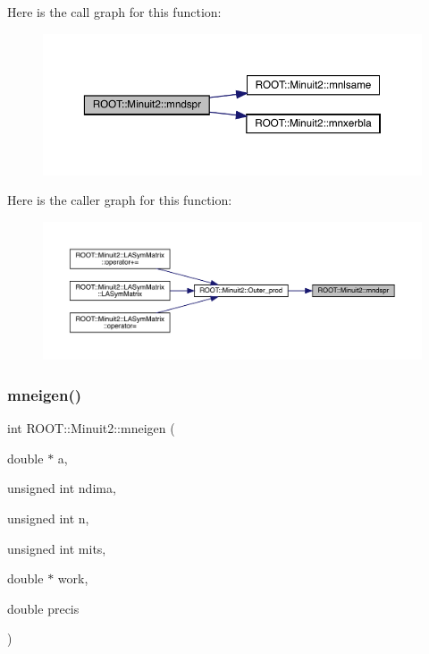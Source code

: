 Here is the call graph for this function\+:
\nopagebreak
\begin{figure}[H]
\begin{center}
\leavevmode
\includegraphics[width=350pt]{d6/d3a/namespaceROOT_1_1Minuit2_acc89c3c759da8dc191d0a862e354a555_cgraph}
\end{center}
\end{figure}
Here is the caller graph for this function\+:
\nopagebreak
\begin{figure}[H]
\begin{center}
\leavevmode
\includegraphics[width=350pt]{d6/d3a/namespaceROOT_1_1Minuit2_acc89c3c759da8dc191d0a862e354a555_icgraph}
\end{center}
\end{figure}
\mbox{\label{namespaceROOT_1_1Minuit2_a4a6b91c57b107c48f582569401bb12e9}} 
\subsubsection{\texorpdfstring{mneigen()}{mneigen()}}
{\footnotesize\ttfamily int R\+O\+O\+T\+::\+Minuit2\+::mneigen (\begin{DoxyParamCaption}\item[{double $\ast$}]{a,  }\item[{unsigned int}]{ndima,  }\item[{unsigned int}]{n,  }\item[{unsigned int}]{mits,  }\item[{double $\ast$}]{work,  }\item[{double}]{precis }\end{DoxyParamCaption})}

